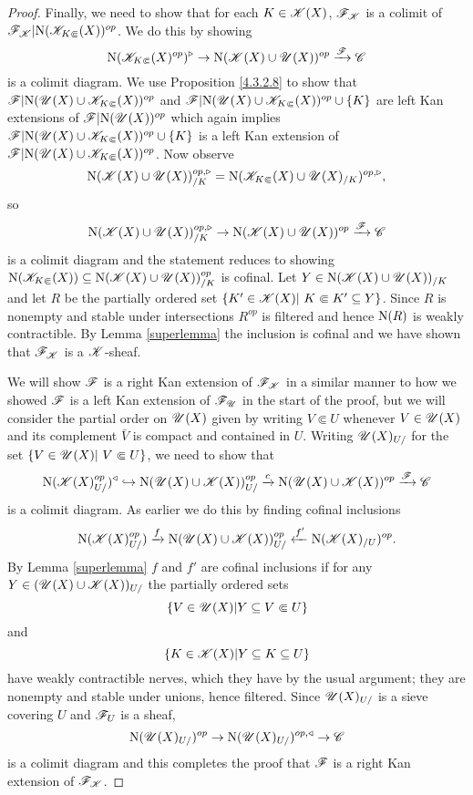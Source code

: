 \documentclass[../thesis.tex]{subfiles}
\begin{document}
\begin{proof}
    Finally, we need to show that for each $K \in \mathscr{K}(X)$, $\mathscr{F}_{\mathscr{K}}$ is a colimit of $\mathscr{F}_{\mathscr{K}}|\mathrm{N}(\mathscr{K}_{K\Subset}(X))^{op}$.
    We do this by showing
    \[
        \mathrm{N}(\mathscr{K}_{K\Subset}(X)^{op})^{\triangleright} \to \mathrm{N}(\mathscr{K}(X) \cup \mathscr{U}(X))^{op} \xrightarrow{\mathscr{F}} \mathscr{C}
    \]
    is a colimit diagram.
    We use Proposition \ref{4.3.2.8} to show that
    $\mathscr{F}|\mathrm{N}(\mathscr{U}(X) \cup \mathscr{K}_{K\Subset}(X))^{op}$ and $\mathscr{F}|\mathrm{N}(\mathscr{U}(X) \cup \mathscr{K}_{K\Subset}(X))^{op} \cup \{K\}$ are left Kan extensions of $\mathscr{F}|\mathrm{N}(\mathscr{U}(X))^{op}$ which again implies $\mathscr{F}|\mathrm{N}(\mathscr{U}(X) \cup \mathscr{K}_{K\Subset}(X))^{op} \cup \{K\}$ is a left Kan extension of $\mathscr{F}|\mathrm{N}(\mathscr{U}(X) \cup \mathscr{K}_{K\Subset}(X))^{op}$.
    Now observe
    \[
        \mathrm{N}(\mathscr{K}(X) \cup \mathscr{U}(X))^{op,\triangleright}_{/K} = \mathrm{N}(\mathscr{K}_{K\Subset}(X) \cup \mathscr{U}(X)_{/K})^{op,\triangleright},
    \]
    so
    \[
        \mathrm{N}(\mathscr{K}(X) \cup \mathscr{U}(X))^{op,\triangleright}_{/K} \to \mathrm{N}(\mathscr{K}(X) \cup \mathscr{U}(X))^{op} \xrightarrow{\mathscr{F}} \mathscr{C}
    \]
    is a colimit diagram and the statement reduces to showing $\mathrm{N}(\mathscr{K}_{K\Subset}(X)) \subseteq \mathrm{N}(\mathscr{K}(X) \cup \mathscr{U}(X))_{/K}^{op}$ is cofinal.
    Let $Y\in \mathrm{N}(\mathscr{K}(X) \cup \mathscr{U}(X))_{/K}$ and let $R$ be the partially ordered set $\{K' \in \K(X) | K \Subset K ' \subseteq Y\}$.
    Since $R$ is nonempty and stable under intersections $R^{op}$ is filtered and hence $\mathrm{N}(R)$ is weakly contractible.
    By Lemma \ref{superlemma} the inclusion is cofinal and we have shown that $\mathscr{F}_{\mathscr{K}}$ is a $\mathscr{K}$-sheaf.

    We will show $\mathscr{F}$ is a right Kan extension of $\mathscr{F}_{\mathscr{K}}$ in a similar manner to how we showed $\mathscr{F}$ is a left Kan extension of $\mathscr{F}_{\mathscr{U}}$ in the start of the proof, but we will consider the partial order on $\mathscr{U}(X)$ given by writing $V\Subset U$ whenever $V\in \mathscr{U}(X)$ and its complement $\bar{V}$ is compact and contained in $U$.
    Writing $\mathscr{U}(X)_{U/}$ for the set $\{V\in \Open(X) | V\Subset U\}$, we need to show that
    \[
        \mathrm{N}(\mathscr{K}(X)_{U/}^{op})^{\triangleleft} \hookrightarrow \mathrm{N}(\mathscr{U}(X) \cup \mathscr{K}(X))_{U/}^{op} \xrightarrow{c}\mathrm{N}(\mathscr{U}(X) \cup \mathscr{K}(X))^{op} \xrightarrow{\mathscr{F}} \mathscr{C}
    \]
    is a colimit diagram.
    As earlier we do this by finding cofinal inclusions
    \[
        \mathrm{N}(\mathscr{K}(X)_{U/}^{op}) \xrightarrow{f}\mathrm{N}(\mathscr{U}(X) \cup \mathscr{K}(X))_{U/}^{op} \xleftarrow{f'} \mathrm{N}(\mathscr{K}(X)_{/U})^{op}.
    \]
    By Lemma \ref{superlemma} $f$ and $f'$ are cofinal inclusions if for any $Y\in (\mathscr{U}(X) \cup \mathscr{K}(X))_{U/}$ the partially ordered sets
    \[
        \{ V \in \mathscr{U}(X) |Y \subseteq V \Subset U \}
    \]
    and
    \[
        \{ K \in \mathscr{K}(X) |Y \subseteq K \subseteq U \}
    \]
    have weakly contractible nerves, which they have by the usual argument; they are nonempty and stable under unions, hence filtered.
    Since $\mathscr{U}(X)_{U/}$ is a sieve covering $U$ and $\mathscr{F}_U$ is a sheaf,
    \[
        \mathrm{N}(\mathscr{U}(X)_{U/})^{op} \to \mathrm{N}(\mathscr{U}(X)_{U/})^{op, \triangleleft} \to \mathscr{C}
    \]
    is a colimit diagram and this completes the proof that $\mathscr{F}$ is a right Kan extension of $\mathscr{F}_{\mathscr{K}}$.
\end{proof}
\end{document}
